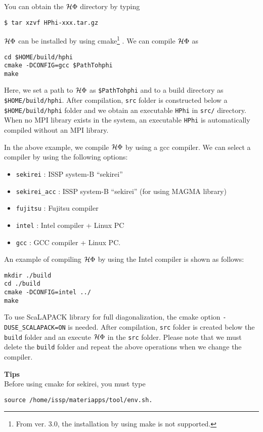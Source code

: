 You can obtain the $\mathcal{H} \Phi$ directory by typing
\begin{verbatim}
$ tar xzvf HPhi-xxx.tar.gz
\end{verbatim}

$\mathcal{H} \Phi$ can be installed by using cmake\footnote{From ver. 3.0, the installation by using make is not supported.}
.
We can compile $\mathcal{H} \Phi$ as
\begin{verbatim}
cd $HOME/build/hphi
cmake -DCONFIG=gcc $PathTohphi
make
\end{verbatim}
Here, we set a path to $\mathcal{H} \Phi$ as \verb|$PathTohphi|
and to a build directory as \verb| $HOME/build/hphi|.
After compilation, \verb|src| folder is constructed below a \verb|$HOME/build/hphi|
folder and we obtain an executable \verb|HPhi| in \verb|src/| directory.
When no MPI library exists in the system, an executable \verb|HPhi|
is automatically compiled without an MPI library.

In the above example,
we compile $\mathcal{H} \Phi$ by using a gcc compiler.
We can select a compiler by using the following options:
\begin{itemize}
\item \verb|sekirei| : ISSP system-B ``sekirei''
\item \verb|sekirei_acc| : ISSP system-B ``sekirei'' (for using MAGMA library)
\item \verb|fujitsu| : Fujitsu compiler
\item \verb|intel| : Intel compiler + Linux PC
\item \verb|gcc| : GCC compiler + Linux PC.
\end{itemize}
An example of compiling $\mathcal{H} \Phi$ by using the Intel compiler is shown as follows:
\begin{verbatim}
mkdir ./build
cd ./build
cmake -DCONFIG=intel ../
make
\end{verbatim}
To use ScaLAPACK library for full diagonalization,  the cmake option \verb|-DUSE_SCALAPACK=ON| is needed.
After compilation,
\verb|src| folder is created below the \verb|build| folder and
an execute $\mathcal{H} \Phi$ in the \verb|src| folder.
Please note that we must delete the \verb|build| folder and
repeat the above operations when we change the compiler.

\begin{screen}
\Large 
{\bf Tips}
\normalsize\\
Before using cmake for sekirei, you must type 
\begin{verbatim}
source /home/issp/materiapps/tool/env.sh.
\end{verbatim}
\end{screen}

